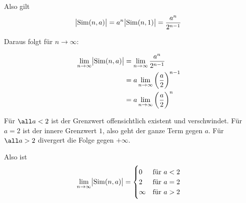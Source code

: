 \documentclass[a4paper,german,12pt,smallheadings]{scrartcl}
\begin{document}

Also gilt
\begin{equation*}
  \envert{\operatorname{Sim}(n,a)} = a^n \envert{\operatorname{Sim}(n,1)} = \frac{a^n}{2^{n-1}}
\end{equation*}

Daraus folgt für $n \to \infty$:

\begin{align*}
  \lim\limits_{n \to \infty} \envert{\operatorname{Sim}(n,a)} &= \lim\limits_{n \to \infty} \frac{a^n}{2^{n-1}} \\
                                                              &= a \lim\limits_{n \to \infty} \del{\frac{a}{2}}^{n-1} \\
                                                              &= a \lim\limits_{n \to \infty} \del{\frac{a}{2}}^{n}
\end{align*}

Für $\all a < 2$ ist der Grenzwert offensichtlich existent und verschwindet. %
Für $a = 2$ ist der innere Grenzwert $1$, also geht der ganze Term gegen $a$.
Für $\all a > 2$ divergert die Folge gegen $+ \infty$.

Also ist
\begin{align*}
  \lim\limits_{n \to \infty} \envert{\operatorname{Sim}(n,a)} =
  \begin{cases} 
    0 &\mbox{für } a < 2 \\
    2 & \mbox{für } a = 2 \\
    \infty & \mbox{für } a > 2 \\
    \end{cases}
\end{align*}
\end{document}
